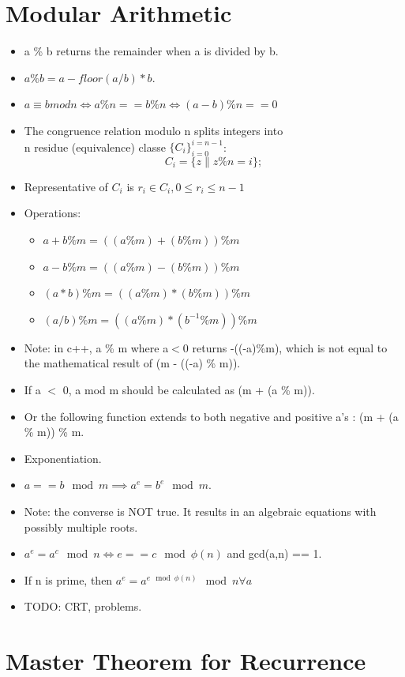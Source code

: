 \documentclass{report}
\begin{document}
\section{Modular Arithmetic}
\begin{itemize}
\item a \% b returns the remainder when a is divided by b.
\item $a \% b = a - floor(a/b)*b$.
\item $a \equiv b mod n \iff a\%n == b\% n \iff (a-b) \% n == 0 $
\item The congruence relation modulo n splits integers into\\n residue (equivalence) classe $\{C_i\}_{i=0}^{i=n-1}$:
\begin{equation}
    C_i = \{z \| z \% n = i\};
\end{equation}
\item Representative of $C_i$ is $r_i \in C_i, 0 \le r_i \le n-1$
\item Operations:
\begin{itemize}
\item $a + b \% m = ((a \% m) + (b \% m)) \% m$
\item $a - b \% m = ((a \% m) - (b \% m)) \% m$
\item $(a*b) \% m = ((a \% m) * (b \% m)) \% m$
\item $(a/b) \% m = ((a \% m) * (b^{-1} \% m)) \% m$
\end{itemize}
\item Note: in c++,  a \% m where a$<$0 returns -((-a)\%m), which is not equal to the mathematical result of
(m - ((-a) \% m)). 
\item If a $<$ 0, a mod m should be calculated as (m + (a \% m)).
\item Or the following function extends to both negative and positive a's : (m + (a \% m)) \% m.
\item Exponentiation.
\item $a == b \mod m \implies a^e = b^e \mod m.$
\item Note: the converse is NOT true. It results in an algebraic equations with possibly multiple roots.
\item $a^e = a^c \mod n \iff e == c \mod \phi(n)$ and gcd(a,n) == 1.
\item If n is prime, then $a^e = a^{e \mod \phi(n)} \mod n \forall a$  
\item TODO: CRT, problems.
\end{itemize}

\section{Master Theorem for Recurrence}
\end{document}
